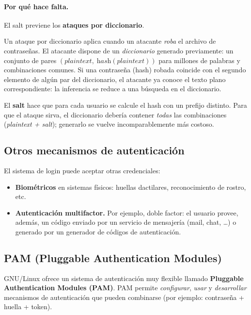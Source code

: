\documentclass[11pt,a4paper]{article}
\begin{document}
\paragraph{Por qué hace falta.}
El salt previene los \textbf{ataques por diccionario}.

\begin{idea}
Un ataque por diccionario aplica cuando un atacante \emph{roba} el
archivo de contraseñas. El atacante dispone de un \emph{diccionario}
generado previamente: un conjunto de pares
$(\textit{plaintext},\;\textit{hash}(\textit{plaintext}))$ para
millones de palabras y combinaciones comunes. Si una contraseña (hash)
robada coincide con el segundo elemento de algún par del diccionario,
el atacante ya conoce el texto plano correspondiente: la inferencia se
reduce a una búsqueda en el diccionario.

El \textbf{salt} hace que para cada usuario se calcule el hash con un
prefijo distinto. Para que el ataque sirva, el diccionario debería
contener \emph{todas} las combinaciones (\emph{plaintext + salt});
generarlo se vuelve incomparablemente más costoso.
\end{idea}

\subsection{Otros mecanismos de autenticación}

El sistema de login puede aceptar otras credenciales:

\begin{itemize}[leftmargin=*]
    \item \textbf{Biométricos} en sistemas físicos: huellas dactilares,
        reconocimiento de rostro, etc.
    \item \textbf{Autenticación multifactor.} Por ejemplo, doble
        factor: el usuario provee, además, un código enviado por un
        servicio de mensajería (mail, chat, \ldots) o generado por un
        generador de códigos de autenticación.
\end{itemize}

\subsection{PAM (Pluggable Authentication Modules)}

GNU/Linux ofrece un sistema de autenticación muy flexible llamado
\textbf{Pluggable Authentication Modules (PAM)}. PAM permite
\emph{configurar}, \emph{usar} y \emph{desarrollar} mecanismos de
autenticación que pueden combinarse (por ejemplo: contraseña +
huella + token).
\end{document}
